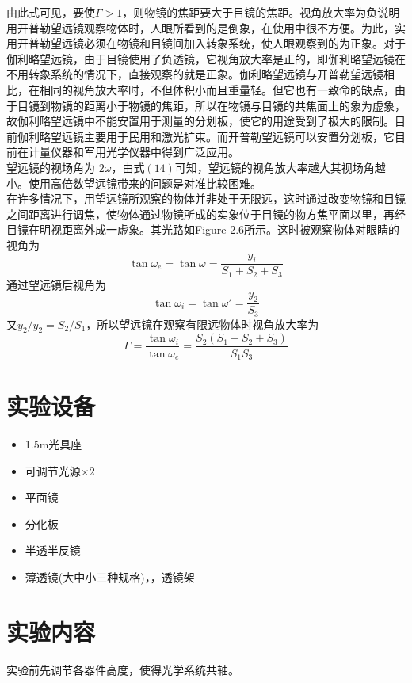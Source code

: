 \documentclass{article}
\begin{document}
\hspace*{2em}由此式可见，要使\(\Gamma > 1\)，则物镜的焦距要大于目镜的焦距。视角放大率为负说明用开普勒望远镜观察物体时，人眼所看到的是倒象，在使用中很不方便。为此，实用开普勒望远镜必须在物镜和目镜间加入转象系统，使人眼观察到的为正象。对于伽利略望远镜，由于目镜使用了负透镜，它视角放大率是正的，即伽利略望远镜在不用转象系统的情况下，直接观察的就是正象。伽利略望远镜与开普勒望远镜相比，在相同的视角放大率时，不但体积小而且重量轻。但它也有一致命的缺点，由于目镜到物镜的距离小于物镜的焦距，所以在物镜与目镜的共焦面上的象为虚象，故伽利略望远镜中不能安置用于测量的分划板，使它的用途受到了极大的限制。目前伽利略望远镜主要用于民用和激光扩束。而开普勒望远镜可以安置分划板，它目前在计量仪器和军用光学仪器中得到广泛应用。\\
\hspace*{2em}望远镜的视场角为 \(2\omega\)，由式\((14)\)可知，望远镜的视角放大率越大其视场角越小。使用高倍数望远镜带来的问题是对准比较困难。\\
\hspace*{2em}在许多情况下，用望远镜所观察的物体并非处于无限远，这时通过改变物镜和目镜之间距离进行调焦，使物体通过物镜所成的实象位于目镜的物方焦平面以里，再经目镜在明视距离外成一虚象。其光路如Figure 2.6所示。这时被观察物体对眼睛的视角为
\begin{equation}
    \tan \omega_e=\tan \omega=\frac{y_i}{S_1+S_2+S_3}
\end{equation}
通过望远镜后视角为
\begin{equation}
    \tan \omega_i=\tan \omega'=\frac{y_2}{S_3}
\end{equation}
又$y_2/y_2=S_2/S_1$，所以望远镜在观察有限远物体时视角放大率为
\begin{equation}
    \Gamma=\frac{\tan \omega_i}{\tan \omega_e}=\frac{S_2(S_1+S_2+S_3)}{S_1S_3}
\end{equation}
\section{实验设备}
\begin{itemize}
    \item 1.5m光具座
    \item 可调节光源$\times 2$
    \item 平面镜
    \item 分化板
    \item 半透半反镜
    \item 薄透镜(大中小三种规格)，，透镜架
\end{itemize}
\section{实验内容}
\hspace*{2em}实验前先调节各器件高度，使得光学系统共轴。
\end{document}
